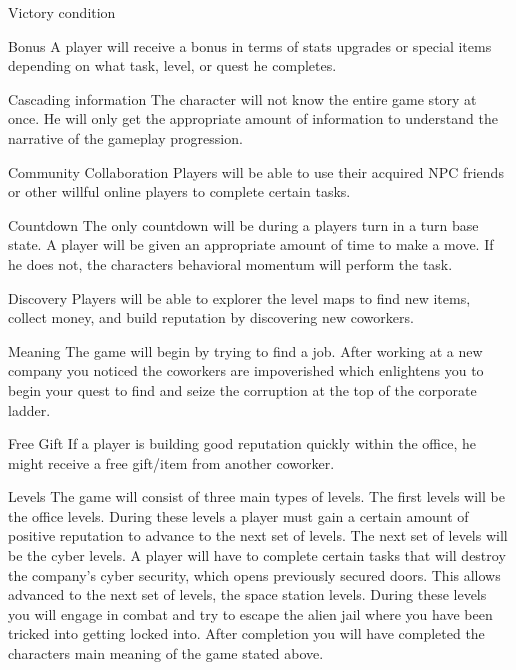 \documentclass[12pt]{article}
\begin{document}
\begin{section}{Victory condition}
\begin{section}{Bonus}
A player will receive a bonus in terms of stats upgrades or special items
depending on what task, level, or quest he completes.
\end{section}

\begin{section}{Cascading information}
The character will not know the entire game story at once. He will only get the
appropriate amount of information to understand the narrative of the gameplay
progression.
\end{section}

\begin{section}{Community Collaboration}
Players will be able to use their acquired NPC friends or other willful online
players to complete certain tasks.
\end{section}

\begin{section}{Countdown}
The only countdown will be during a players turn in a turn base state. A player
will be given an appropriate amount of time to make a move. If he does not, the
characters behavioral momentum will perform the task.
\end{section}

\begin{section}{Discovery}
Players will be able to explorer the level maps to find new items, collect
money, and build reputation by discovering new coworkers.
\end{section}

\begin{section}{Meaning}
The game will begin by trying to find a job. After working at a new company you
noticed the coworkers are impoverished which enlightens you to begin your quest
to find and seize the corruption at the top of the corporate ladder.
\end{section}

\begin{section}{Free Gift}
If a player is building good reputation quickly within the office, he might
receive a free gift/item from another coworker.
\end{section}

\begin{section}{Levels}
The game will consist of three main types of levels. The first levels will be
the office levels. During these levels a player must gain a certain amount of
positive reputation to advance to the next set of levels. The next set of levels
will be the cyber levels. A player will have to complete certain tasks that will
destroy the company’s cyber security, which opens previously secured doors. This
allows advanced to the next set of levels, the space station levels. During
these levels you will engage in combat and try to escape the alien jail where
you have been tricked into getting locked into. After completion you will have
completed the characters main meaning of the game stated above.
\end{section}


\end{section}
\end{document}

